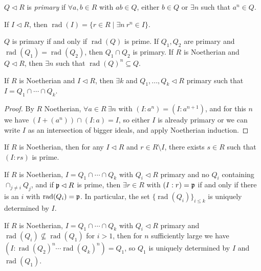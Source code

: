 \documentclass[letterpaper,11pt]{report}
\DeclareMathOperator{\rad}{rad}
\begin{document}
\begin{defn} $Q \lhd R$ is \emph{primary} if $\forall a,b\in R$ with $ab \in Q$, either $b \in Q$ or $\exists n$ such that $a^n \in Q$.
\end{defn}

\begin{defn} If $I \lhd R$, then $\rad(I) = \{r \in R \mid \exists n\ r^n \in I\}$.
\end{defn}

\begin{prop} $Q$ is primary if and only if $\rad(Q)$ is prime. If $Q_1, Q_2$ are primary and $\rad(Q_1) = \rad(Q_2)$, then $Q_1 \cap Q_2$ is primary. If $R$ is Noetherian and $Q \lhd R$, then $\exists n$ such that $\rad(Q)^n \subseteq Q$.
\end{prop}

\begin{thm} If $R$ is Noetherian and $I \lhd R$, then $\exists k$ and $Q_1, ..., Q_k \lhd R$ primary such that $I = Q_1 \cap \cdots \cap Q_k$.
\end{thm}
\begin{proof} By $R$ Noetherian, $\forall a\in R\ \exists n$ with $(I:a^n) = (I:a^{n+1})$, and for this $n$ we have $(I+(a^n))\cap (I:a) = I$, so either $I$ is already primary or we can write $I$ as an intersection of bigger ideals, and apply Noetherian induction.
\end{proof}

\begin{lem} If $R$ is Noetherian, then for any $I \lhd R$ and $r \in R \setminus I$, there exists $s \in R$ such that $(I:rs)$ is prime.
\end{lem}

\begin{thm} If $R$ is Noetherian, $I = Q_1 \cap \cdots \cap Q_k$ with $Q_i \lhd R$ primary and no $Q_i$ containing $\cap_{j \ne i} Q_j$, and if $\mathfrak{p} \lhd R$ is prime, then $\exists r \in R$ with $(I:r) = \mathfrak{p}$ if and only if there is an $i$ with $\rad(Q_i) = \fp$. In particular, the set $\{\rad(Q_i)\}_{i \le k}$ is uniquely determined by $I$.
\end{thm}

\begin{thm} If $R$ is Noetherian, $I = Q_1 \cap \cdots \cap Q_k$ with $Q_i \lhd R$ primary and $\rad(Q_i) \not\subseteq \rad(Q_1)$ for $i > 1$, then for $n$ sufficiently large we have $(I:\rad(Q_2)^n \cdots \rad(Q_k)^n) = Q_1$, so $Q_1$ is uniquely determined by $I$ and $\rad(Q_1)$.
\end{thm}
\end{document}
